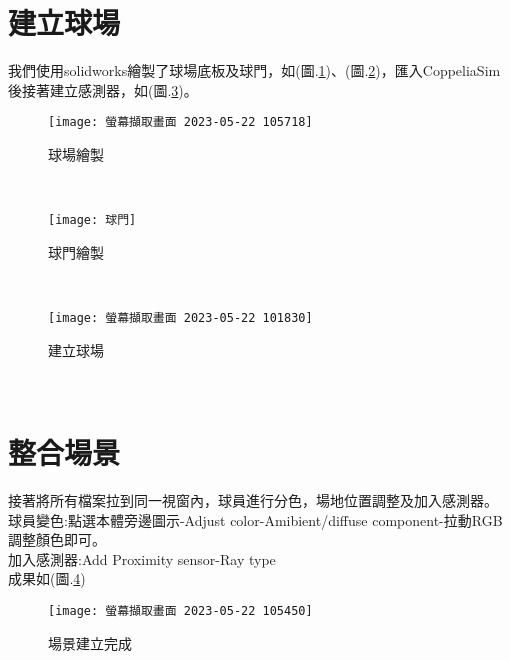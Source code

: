 \section{建立球場}
我們使用solidworks繪製了球場底板及球門，如(圖.\ref{球場繪製})、(圖.\ref{球門繪製})，匯入CoppeliaSim後接著建立感測器，如(圖.\ref{建立球場})。\
\begin{figure}[hbt!]
\begin{center}
\texttt{[image: 螢幕擷取畫面 2023-05-22 105718]}
\caption{\Large 球場繪製}\label{球場繪製}
\end{center}
\end{figure}\
\begin{figure}[hbt!]
\begin{center}
\texttt{[image: 球門]}
\caption{\Large 球門繪製}\label{球門繪製}
\end{center}
\end{figure}\
\begin{figure}[hbt!]
\begin{center}
\texttt{[image: 螢幕擷取畫面 2023-05-22 101830]}
\caption{\Large 建立球場}\label{建立球場}
\end{center}
\end{figure}\
\newpage
\section{整合場景}
接著將所有檔案拉到同一視窗內，球員進行分色，場地位置調整及加入感測器。\\
球員變色:點選本體旁邊圖示-Adjust color-Amibient/diffuse component-拉動RGB調整顏色即可。\\
加入感測器:Add Proximity sensor-Ray type\\
成果如(圖.\ref{場景建立完成})
\begin{figure}[hbt!]
\begin{center}
\texttt{[image: 螢幕擷取畫面 2023-05-22 105450]}
\caption{\Large 場景建立完成}\label{場景建立完成}
\end{center}
\end{figure}\
\newpage